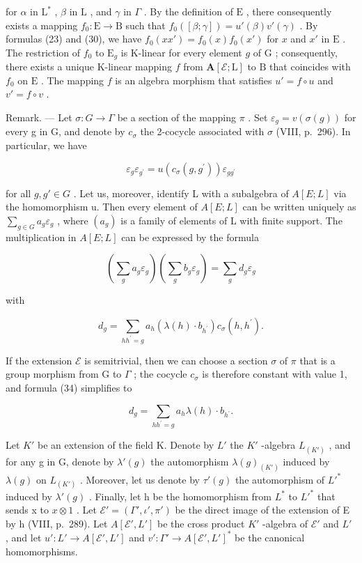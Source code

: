 for \(\alpha\) in \(\mathrm{L}^*\) , \(\beta\) in \(\mathrm{L}\) , and \(\gamma\) in \(\Gamma\) . By the definition of \(\mathrm{E}\) , there consequently exists a mapping \(f_0: \mathrm{E} \to \mathrm{B}\) such that \(f_0([\beta; \gamma]) = u'(\beta)v'(\gamma)\) . By formulas (23) and (30), we have \(f_0(xx') = f_0(x)f_0(x')\) for \(x\) and \(x'\) in \(\mathrm{E}\) . The restriction of \(f_0\) to \(\mathrm{E}_g\) is K-linear for every element \(g\) of \(\mathrm{G}\) ; consequently, there exists a unique K-linear mapping \(f\) from \(\mathbf{A}[\mathcal{E}; \mathrm{L}]\) to \(\mathrm{B}\) that coincides with \(f_0\) on \(\mathrm{E}\) . The mapping \(f\) is an algebra morphism that satisfies \(u' = f \circ u\) and \(v' = f \circ v\) .

Remark. --- Let \(\sigma: G \to \Gamma\) be a section of the mapping \(\pi\) . Set \(\varepsilon_{g} = v(\sigma(g))\) for every g in G, and denote by \(c_{\sigma}\) the 2-cocycle associated with \(\sigma\) (VIII, p.~296). In particular, we have

\[
\varepsilon_ {g} \varepsilon_ {g ^ {\prime}} = u (c _ {\sigma} (g, g ^ {\prime})) \varepsilon_ {g g ^ {\prime}}\tag{32}
\]

for all \(g, g' \in G\) . Let us, moreover, identify L with a subalgebra of \(A[E; L]\) via the homomorphism u. Then every element of \(A[E; L]\) can be written uniquely as \(\sum_{g \in G} a_g \varepsilon_g\) , where \((a_g)\) is a family of elements of L with finite support. The multiplication in \(A[E; L]\) can be expressed by the formula

\[
\left(\sum_ {g} a _ {g} \varepsilon_ {g}\right) \left(\sum_ {g} b _ {g} \varepsilon_ {g}\right) = \sum_ {g} d _ {g} \varepsilon_ {g}\tag{33}
\]

with

\[
d _ {g} = \sum_ {h h ^ {\prime} = g} a _ {h} (\lambda (h) \cdot b _ {h ^ {\prime}}) c _ {\sigma} (h, h ^ {\prime}).\tag{34}
\]

If the extension \(\mathcal{E}\) is semitrivial, then we can choose a section \(\sigma\) of \(\pi\) that is a group morphism from G to \(\Gamma\) ; the cocycle \(c_{\sigma}\) is therefore constant with value 1, and formula (34) simplifies to

\[
d _ {g} = \sum_ {h h ^ {\prime} = g} a _ {h} \lambda (h) \cdot b _ {h ^ {\prime}}.\tag{35}
\]

Let \(K'\) be an extension of the field K. Denote by \(L'\) the \(K'\) -algebra \(L_{(K')}\) , and for any g in G, denote by \(\lambda'(g)\) the automorphism \(\lambda(g)_{(K')}\) induced by \(\lambda(g)\) on \(L_{(K')}\) . Moreover, let us denote by \(\tau'(g)\) the automorphism of \(L'^*\) induced by \(\lambda'(g)\) . Finally, let h be the homomorphism from \(L^*\) to \(L'^*\) that sends x to \(x \otimes 1\) . Let \(\mathcal{E}' = (\Gamma', \iota', \pi')\) be the direct image of the extension of E by h (VIII, p.~289). Let \(A[\mathcal{E}', L']\) be the cross product \(K'\) -algebra of \(\mathcal{E}'\) and \(L'\) , and let \(u': L' \to A[\mathcal{E}', L']\) and \(v': \Gamma' \to A[\mathcal{E}', L']^*\) be the canonical homomorphisms.


